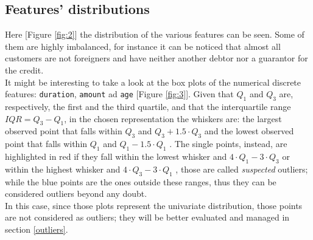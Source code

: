 \documentclass[letterpaper]{article}
\begin{document}
	\subsection{Features' distributions} \label{features distrubution}
	Here [Figure \ref{fig:2}] the distribution of the various features can be seen. Some of them are highly imbalanced, for instance it can be noticed that almost all customers are not foreigners and have neither another debtor nor a guarantor for the credit. \\
	It might be interesting to take a look at the box plots of the numerical discrete features: \texttt{duration}, \texttt{amount} ad \texttt{age}  [Figure \ref{fig:3}]. Given that $Q_1$ and $Q_3$ are, respectively, the first and the third quartile, and that the interquartile range $IQR = Q_3 - Q_1$, in the chosen representation the whiskers are: the largest observed point that falls within $Q_3$ and $Q_3 + 1.5\cdot Q_3$ and the lowest observed point that falls within $Q_1$ and $Q_1 - 1.5\cdot Q_1$ \cite{boxplots_wiki}. The single points, instead, are highlighted in red if they fall within the lowest whisker and $4\cdot Q_1 - 3\cdot Q_3$ or within the highest whisker and  $4\cdot Q_3 - 3\cdot Q_1$ \cite{boxplots}, those are called \emph{suspected} outliers; while the blue points are the ones outside these ranges, thus they can be considered outliers beyond any doubt. \\
	In this case, since those plots represent the univariate distribution, those points are not considered as outliers; they will be better evaluated and managed in section \ref{outliers}.
\end{document}
